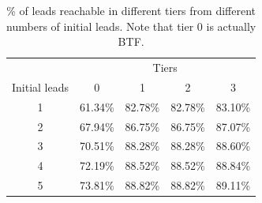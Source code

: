 \documentclass[prodmode,acmtecs]{acmsmall} %
\newcommand{\note}[2]{\textbf{\textsc{#1} says: \textit{#2}}}
\begin{document}
 




\begin{table}[t!]
\centering
\begin{tabular}{c | c| c |c| c }

			  & \multicolumn{4}{|c}{Tiers}\\
Initial leads & 0 & 1 & 2 & 3 \\
\hline
1 & 61.34\% & 82.78\% & 82.78\% & 83.10\%\\
2 & 67.94\% & 86.75\% & 86.75\% & 87.07\%\\
3 & 70.51\% & 88.28\% & 88.28\% & 88.60\%\\
4 & 72.19\% & 88.52\% & 88.52\% & 88.84\%\\
5 & 73.81\% & 88.82\% & 88.82\% & 89.11\%\\

\end{tabular}%
\caption{\label{tab:tiers}\label{tab:BTFtiers}\% of leads reachable in different tiers from different numbers of initial leads. Note that tier 0 is actually BTF. %
%
}%
\end{table}

\end{document}
